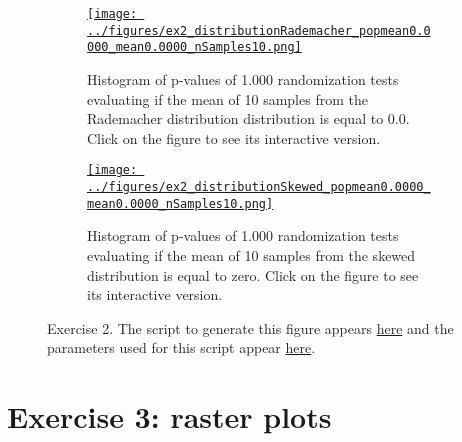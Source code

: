 \documentclass{article}
\def\fig_width{3.5in}
\begin{document}
\begin{figure}[H]
    \begin{center}

        \begin{subfigure}{1.0\textwidth}
            \centering
            \href{https://www.gatsby.ucl.ac.uk/~rapela/neuroinformatics/2023/ws1/figures/ex2_distributionRademacher_popmean0.0000_mean0.0000_nSamples10.html}{\texttt{[image: ../figures/ex2\_distributionRademacher\_popmean0.0000\_mean0.0000\_nSamples10.png]}}

            \caption{Histogram of p-values of 1.000 randomization tests evaluating
            if the mean of 10 samples from the Rademacher
            distribution distribution is equal to 0.0.  Click on the
            figure to see its interactive version.}

            \label{fig:ex2_1}
        \end{subfigure}

        \begin{subfigure}{1.0\textwidth}
            \centering
            \href{https://www.gatsby.ucl.ac.uk/~rapela/neuroinformatics/2023/ws1/figures/ex2_distributionSkewed_popmean0.0000_mean0.0000_nSamples10.html}{\texttt{[image: ../figures/ex2\_distributionSkewed\_popmean0.0000\_mean0.0000\_nSamples10.png]}}

            \caption{Histogram of p-values of 1.000 randomization tests evaluating if the mean
            of 10 samples from the skewed distribution is equal to zero.
            Click on the figure to see its interactive version.}

            \label{fig:ex2_2}
        \end{subfigure}

        \caption{Exercise 2. The script to generate this figure appears
        \href{https://github.com/joacorapela/neuroinformatics23/blob/master/worksheets/ws1/mySolution/code/scripts/doEx2.py}{here}
        and the parameters used for this script appear
        \href{https://github.com/joacorapela/neuroinformatics23/blob/master/worksheets/ws1/mySolution/code/scripts/doEx2.csh}{here}.
        }

        \label{fig:ex2}

    \end{center}
\end{figure}

\section*{Exercise 3: raster plots}
\end{document}
